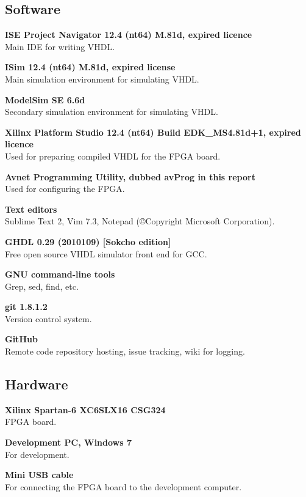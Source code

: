 \subsection{Software}
\begin{description}
    \item{\textbf{ISE Project Navigator 12.4 (nt64) M.81d, expired licence}} \\
        Main IDE for writing VHDL.
    \item{\textbf{ISim 12.4 (nt64) M.81d, expired license}} \\
        Main simulation environment for simulating VHDL.
    \item{\textbf{ModelSim SE 6.6d}} \\
        Secondary simulation environment for simulating VHDL.
    \item{\textbf{Xilinx Platform Studio 12.4 (nt64) Build EDK\_MS4.81d+1, expired licence}} \\
        Used for preparing compiled VHDL for the FPGA board.
    \item{\textbf{Avnet Programming Utility, dubbed avProg in this report}} \\
        Used for configuring the FPGA.
    \item{\textbf{Text editors}} \\
        Sublime Text 2, Vim 7.3, Notepad (©Copyright Microsoft Corporation).
    \item{\textbf{GHDL 0.29 (2010109) [Sokcho edition]}} \\
        Free open source VHDL simulator front end for GCC.

    \item{\textbf{GNU command-line tools}} \\
        Grep, sed, find, etc.
    \item{\textbf{git 1.8.1.2}} \\
        Version control system.
    \item{\textbf{GitHub}} \\
        Remote code repository hosting, issue tracking, wiki for logging.
\end{description}

\subsection{Hardware}
\begin{description}
\item{\textbf{Xilinx Spartan-6 XC6SLX16 CSG324}} \\
    FPGA board.
\item{\textbf{Development PC, Windows 7}} \\
    For development.
\item{\textbf{Mini USB cable}} \\
    For connecting the FPGA board to the development computer.
\end{description}


